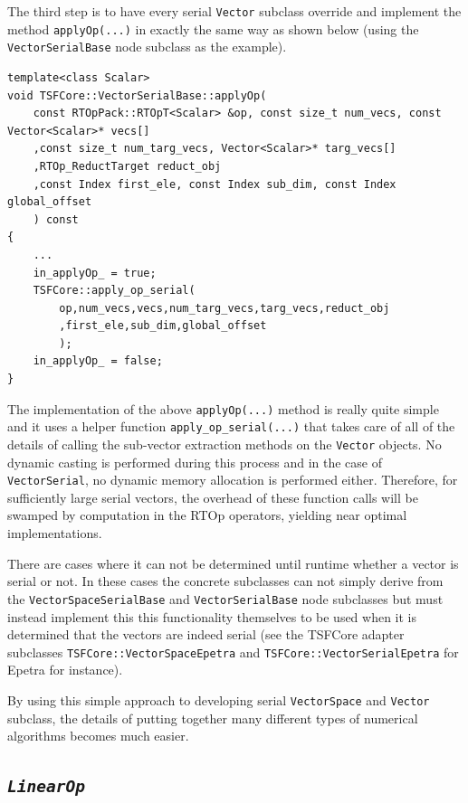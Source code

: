 \documentclass[10pt,fleqn]{article}
\begin{document}
The third step is to have every serial \texttt{Vector} subclass
override and implement the method \texttt{applyOp(...)} in exactly the
same way as shown below (using the \texttt{VectorSerialBase} node
subclass as the example).

{\scriptsize\begin{verbatim}
template<class Scalar>
void TSFCore::VectorSerialBase::applyOp(
    const RTOpPack::RTOpT<Scalar> &op, const size_t num_vecs, const Vector<Scalar>* vecs[]
    ,const size_t num_targ_vecs, Vector<Scalar>* targ_vecs[]
    ,RTOp_ReductTarget reduct_obj
    ,const Index first_ele, const Index sub_dim, const Index global_offset
    ) const
{
    ...
    in_applyOp_ = true;
    TSFCore::apply_op_serial(
        op,num_vecs,vecs,num_targ_vecs,targ_vecs,reduct_obj
        ,first_ele,sub_dim,global_offset
        );
    in_applyOp_ = false;
}
\end{verbatim}}

The implementation of the above \texttt{applyOp(...)} method is really
quite simple and it uses a helper function
\texttt{apply\_op\_serial(...)}  that takes care of all of the details
of calling the sub-vector extraction methods on the \texttt{Vector}
objects.  No dynamic casting is performed during this process and in
the case of \texttt{VectorSerial}, no dynamic memory allocation is
performed either.  Therefore, for sufficiently large serial vectors,
the overhead of these function calls will be swamped by computation in
the RTOp operators, yielding near optimal implementations.

There are cases where it can not be determined until runtime whether a
vector is serial or not.  In these cases the concrete subclasses can
not simply derive from the \texttt{VectorSpace\-SerialBase} and
\texttt{VectorSerialBase} node subclasses but must instead implement
this this functionality themselves to be used when it is determined
that the vectors are indeed serial (see the TSFCore adapter subclasses
\texttt{TSFCore::VectorSpaceEpetra} and \texttt{TSFCore::VectorSerialEpetra} for
Epetra for instance).

By using this simple approach to developing serial
\texttt{\texttt{VectorSpace}} and \texttt{\texttt{Vector}} subclass,
the details of putting together many different types of numerical
algorithms becomes much easier.

%
\subsection{\texttt{\textit{LinearOp}}}
\label{tsfcore:sec:linear_op}
%
\end{document}
